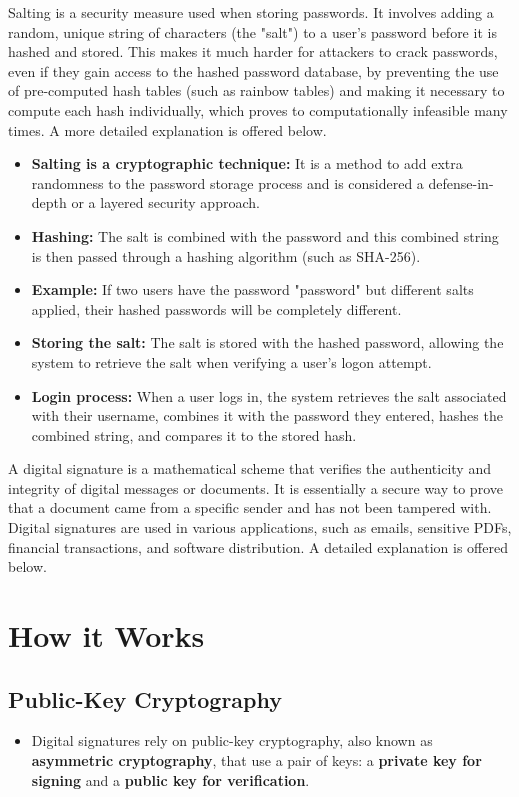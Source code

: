  Salting is a security measure used when storing passwords. It involves adding a random, unique string of characters (the "salt") to a user's password before it is hashed and stored. This makes it much harder for attackers to crack passwords, even if they gain access to the hashed password database, by preventing the use of pre-computed hash tables (such as rainbow tables) and making it necessary to compute each hash individually, which proves to computationally infeasible many times. A more detailed explanation is offered below.
\begin{itemize}
    \item \textbf{Salting is a cryptographic technique:} It is a method to add extra randomness to the password storage process and is considered a defense-in-depth or a layered security approach.
    \item \textbf{Hashing:} The salt is combined with the password and this combined string is then passed through a hashing algorithm (such as SHA-256).
    \item \textbf{Example:} If two users have the password "password" but different salts applied, their hashed passwords will be completely different.
    \item \textbf{Storing the salt:} The salt is stored with the hashed password, allowing the system to retrieve the salt when verifying a user's logon attempt.
    \item \textbf{Login process:} When a user logs in, the system retrieves the salt associated with their username, combines it with the password they entered, hashes the combined string, and compares it to the stored hash.
\end{itemize}

 A digital signature is a mathematical scheme that verifies the authenticity and integrity of digital messages or documents. It is essentially a secure way to prove that a document came from a specific sender and has not been tampered with. Digital signatures are used in various applications, such as emails, sensitive PDFs, financial transactions, and software distribution. A detailed explanation is offered below.

\section{How it Works}

\subsection{Public-Key Cryptography}
\begin{itemize}
    \item Digital signatures rely on public-key cryptography, also known as \textbf{asymmetric cryptography}, that use a pair of keys: a \textbf{ private key for signing} and a \textbf{public key for verification}. 
\end{itemize}

